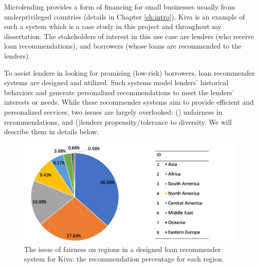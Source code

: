 
Microlending provides a form of financing for small businesses usually from underprivileged countries (details in Chapter \ref{ch:intro}). Kiva is an example of such a system which is a case study in this project and throughout my dissertation. The stakeholders of interest in this use case are lenders (who receive loan recommendations), and borrowers (whose loans are recommended to the lenders).

To assist lenders in looking for promising (low-risk) borrowers, loan recommender systems \cite{choo2014gather,choo2014understanding} are designed and utilized. Such systems model lenders' historical behaviors and generate personalized recommendations to meet the lenders' interests or needs. While these recommender systems aim to provide efficient and personalized services, two issues are largely overlooked: () unfairness in recommendations, and ()lenders propensity/tolerance to diversity. We will describe them in details below. 

\begin{figure}[htb]
\includegraphics[width=0.98\columnwidth]{imgs/far/kiva.png}
\caption{The issue of fairness on regions in a designed loan recommender system \cite{choo2014gather} for Kiva: the recommendation percentage for each region.}
\label{fig:recom_result}
\end{figure}

